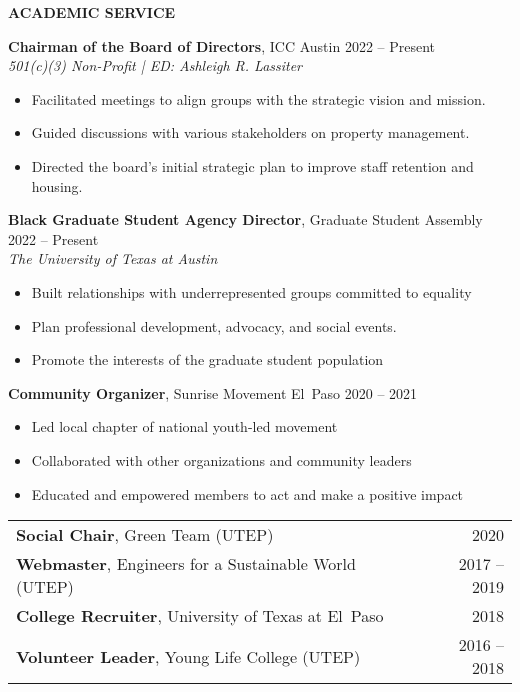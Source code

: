 \documentclass[11pt]{article}
\newcommand{\sectionheading}[1]{%
    \vspace{1.6ex}%
    {\large\bfseries\MakeUppercase{#1}}\par\vspace{0.8ex}%
  }
\newcommand{\sectionheading}[1]{%
    \vspace{1.6ex}%
    {\large\bfseries{\SansHead \MakeUppercase{#1}}}\par\vspace{0.8ex}%
  }
\begin{document}
\sectionheading{Academic Service}

\textbf{Chairman of the Board of Directors}, ICC Austin \hfill 2022 -- Present\\
\textit{501(c)(3) Non-Profit \;|\; ED: Ashleigh R. Lassiter}
\begin{itemize}
  \item Facilitated meetings to align groups with the strategic vision and mission.
  \item Guided discussions with various stakeholders on property management.
  \item Directed the board’s initial strategic plan to improve staff retention and housing.
\end{itemize}

\textbf{Black Graduate Student Agency Director}, Graduate Student Assembly \hfill 2022 -- Present\\
\textit{The University of Texas at Austin}
\begin{itemize}
  \item Built relationships with underrepresented groups committed to equality
  \item Plan professional development, advocacy, and social events.
  \item Promote the interests of the graduate student population
\end{itemize}

\textbf{Community Organizer}, Sunrise Movement El Paso \hfill 2020 -- 2021
\begin{itemize}
  \item Led local chapter of national youth-led movement
  \item Collaborated with other organizations and community leaders
  \item Educated and empowered members to act and make a positive impact
\end{itemize}

\begin{tabular*}{\textwidth}{@{\extracolsep{\fill}}p{}r}
  \textbf{Social Chair}, Green Team (UTEP) & 2020\\[0.4ex]
  \textbf{Webmaster}, Engineers for a Sustainable World (UTEP) & 2017 -- 2019\\[0.4ex]
  \textbf{College Recruiter}, University of Texas at El Paso & 2018\\[0.4ex]
  \textbf{Volunteer Leader}, Young Life College (UTEP) & 2016 -- 2018\\
\end{tabular*}
\end{document}
